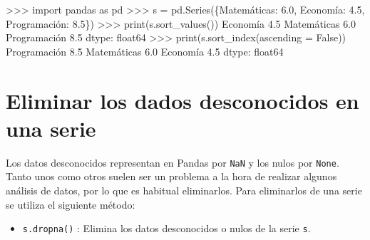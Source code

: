 \documentclass[
  spanish,
  a4paper,
]{scrreport}
\newenvironment{Shaded}{\begin{snugshade}}{\end{snugshade}}
\newcommand{\BuiltInTok}[1]{\textcolor[rgb]{0.00,0.23,0.31}{#1}}
\newcommand{\FloatTok}[1]{\textcolor[rgb]{0.68,0.00,0.00}{#1}}
\newcommand{\ImportTok}[1]{\textcolor[rgb]{0.00,0.46,0.62}{#1}}
\newcommand{\NormalTok}[1]{\textcolor[rgb]{0.00,0.23,0.31}{#1}}
\newcommand{\OperatorTok}[1]{\textcolor[rgb]{0.37,0.37,0.37}{#1}}
\newcommand{\StringTok}[1]{\textcolor[rgb]{0.13,0.47,0.30}{#1}}
\newcommand{\VariableTok}[1]{\textcolor[rgb]{0.07,0.07,0.07}{#1}}
\providecommand{\tightlist}{%
  \setlength{\itemsep}{0pt}\setlength{\parskip}{0pt}}
\begin{document}
\begin{Shaded}
\begin{Highlighting}[]
\OperatorTok{\textgreater{}\textgreater{}\textgreater{}} \ImportTok{import}\NormalTok{ pandas }\ImportTok{as}\NormalTok{ pd}
\OperatorTok{\textgreater{}\textgreater{}\textgreater{}}\NormalTok{ s }\OperatorTok{=}\NormalTok{ pd.Series(\{}\StringTok{\textquotesingle{}Matemáticas\textquotesingle{}}\NormalTok{: }\FloatTok{6.0}\NormalTok{,  }\StringTok{\textquotesingle{}Economía\textquotesingle{}}\NormalTok{: }\FloatTok{4.5}\NormalTok{, }\StringTok{\textquotesingle{}Programación\textquotesingle{}}\NormalTok{: }\FloatTok{8.5}\NormalTok{\})}
\OperatorTok{\textgreater{}\textgreater{}\textgreater{}} \BuiltInTok{print}\NormalTok{(s.sort\_values())}
\NormalTok{Economía        }\FloatTok{4.5}
\NormalTok{Matemáticas     }\FloatTok{6.0}
\NormalTok{Programación    }\FloatTok{8.5}
\NormalTok{dtype: float64}
\OperatorTok{\textgreater{}\textgreater{}\textgreater{}} \BuiltInTok{print}\NormalTok{(s.sort\_index(ascending }\OperatorTok{=} \VariableTok{False}\NormalTok{))}
\NormalTok{Programación    }\FloatTok{8.5}
\NormalTok{Matemáticas     }\FloatTok{6.0}
\NormalTok{Economía        }\FloatTok{4.5}
\NormalTok{dtype: float64}
\end{Highlighting}
\end{Shaded}

\section{Eliminar los dados desconocidos en una
serie}\label{eliminar-los-dados-desconocidos-en-una-serie}

Los datos desconocidos representan en Pandas por \texttt{NaN} y los
nulos por \texttt{None}. Tanto unos como otros suelen ser un problema a
la hora de realizar algunos análisis de datos, por lo que es habitual
eliminarlos. Para eliminarlos de una serie se utiliza el siguiente
método:

\begin{itemize}
\tightlist
\item
  \texttt{s.dropna()} : Elimina los datos desconocidos o nulos de la
  serie \texttt{s}.
\end{itemize}
\end{document}
